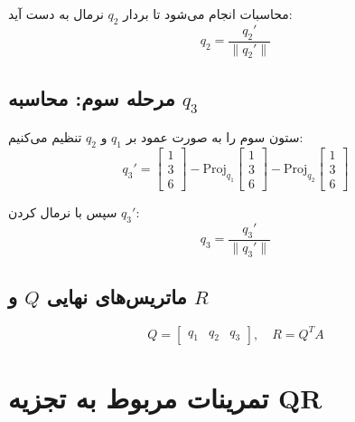 \begin{solution}
	محاسبات انجام می‌شود تا بردار \( q_2 \) نرمال به دست آید:
	\[
	q_2 = \frac{q_2'}{\|q_2'\|}
	\]
	
	\subsection*{مرحله سوم: محاسبه \( q_3 \)}
	ستون سوم را به صورت عمود بر \( q_1 \) و \( q_2 \) تنظیم می‌کنیم:
	\[
	q_3' = \begin{bmatrix} 1 \\ 3 \\ 6 \end{bmatrix} - \text{Proj}_{q_1}\begin{bmatrix} 1 \\ 3 \\ 6 \end{bmatrix} - \text{Proj}_{q_2}\begin{bmatrix} 1 \\ 3 \\ 6 \end{bmatrix}
	\]
	
	سپس با نرمال کردن \( q_3' \):
	\[
	q_3 = \frac{q_3'}{\|q_3'\|}
	\]
	
	\subsection*{ماتریس‌های نهایی \( Q \) و \( R \)}
	\[
	Q = \begin{bmatrix}
		q_1 & q_2 & q_3
	\end{bmatrix}, \quad
	R = Q^T A
	\]
\end{solution}

\section*{تمرینات مربوط به تجزیه QR}


